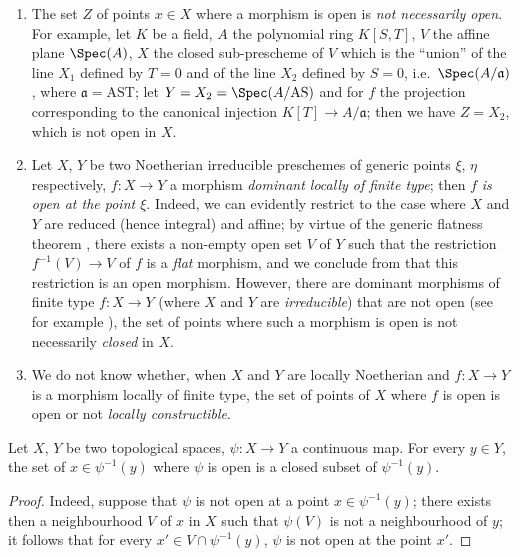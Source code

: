\begin{remarks}[14.1.3]
\label{IV.14.1.3}
\begin{enumerate}[label=(\roman*)]
  \item The set $Z$ of points $x\in X$ where a morphism is open is \emph{not necessarily open}.
  For example, let $K$ be a field, $A$ the polynomial ring $K[S,T]$, $V$ the affine plane $\Spec(A)$, $X$ the closed sub-prescheme of $V$ which is the ``union'' of the line $X_1$ defined by $T=0$ and of the line $X_2$ defined by $S=0$, i.e.\ $\Spec(A/\mathfrak{a})$, where $\mathfrak{a}=\mathrm{AST}$; let $Y=X_2=\Spec(A/\mathrm{AS})$ and for $f$ the projection corresponding to the canonical injection $K[T]\to A/\mathfrak{a}$; then we have $Z=X_2$, which is not open in $X$.

  \item Let $X$, $Y$ be two Noetherian irreducible preschemes of generic points $\xi$, $\eta$ respectively, $f:X\to Y$ a morphism \emph{dominant locally of finite type}; then $f$ \emph{is open at the point $\xi$}.
  Indeed, we can evidently restrict to the case where $X$ and $Y$ are reduced (hence integral)  and affine; by virtue of the generic flatness theorem , there exists a non-empty open set $V$ of $Y$ such that the restriction $f^{-1}(V)\to V$ of $f$ is a \emph{flat} morphism, and we conclude from  that this restriction is an open morphism.
  However, there are dominant morphisms of finite type $f:X\to Y$ (where $X$ and $Y$ are \emph{irreducible}) that are not open (see for example ), the set of points where such a morphism is open is not necessarily \emph{closed} in $X$.

  \item We do not know whether, when $X$ and $Y$ are locally Noetherian and $f:X\to Y$ is a morphism locally of finite type, the set of points of $X$ where $f$ is open is open or not \emph{locally constructible}.
\end{enumerate}
\end{remarks}

\begin{proposition}[14.1.4]
\label{IV.14.1.4}
Let $X$, $Y$ be two topological spaces, $\psi:X\to Y$ a continuous map.
For every $y\in Y$, the set of $x\in\psi^{-1}(y)$ where $\psi$ is open is a closed subset of $\psi^{-1}(y)$.
\end{proposition}

\begin{proof}
Indeed, suppose that $\psi$ is not open at a point $x\in\psi^{-1}(y)$; there exists then a neighbourhood $V$ of $x$ in $X$ such that $\psi(V)$ is not a neighbourhood of $y$; it follows that for every $x'\in V\cap\psi^{-1}(y)$, $\psi$ is not open at the point $x'$.
\end{proof}

